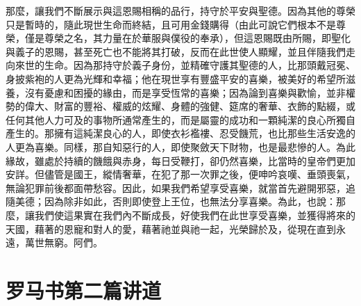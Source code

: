 那麼，讓我們不斷展示與這恩賜相稱的品行，持守於平安與聖德。因為其他的尊榮只是暫時的，隨此現世生命而終結，且可用金錢購得（由此可說它們根本不是尊榮，僅是尊榮之名，其力量在於華服與僕役的奉承），但這恩賜既由所賜，即聖化與義子的恩賜，甚至死亡也不能將其打破，反而在此世使人顯耀，並且伴隨我們走向來世的生命。因為那持守於義子身份，並精確守護其聖德的人，比那頭戴冠冕、身披紫袍的人更為光輝和幸福；他在現世享有豐盛平安的喜樂，被美好的希望所滋養，沒有憂慮和困擾的緣由，而是享受恆常的喜樂；因為論到喜樂與歡愉，並非權勢的偉大、財富的豐裕、權威的炫耀、身體的強健、筵席的奢華、衣飾的點綴，或任何其他人力可及的事物所通常產生的，而是屬靈的成功和一顆純潔的良心所獨自產生的。那擁有這純潔良心的人，即使衣衫襤褸、忍受饑荒，也比那些生活安逸的人更為喜樂。同樣，那自知惡行的人，即使聚斂天下財物，也是最悲慘的人。為此緣故，雖處於持續的饑餓與赤身，每日受鞭打，卻仍然喜樂，比當時的皇帝們更加安詳。但儘管是國王，縱情奢華，在犯了那一次罪之後，便呻吟哀嘆、垂頭喪氣，無論犯罪前後都面帶愁容。因此，如果我們希望享受喜樂，就當首先避開邪惡，追隨美德；因為除非如此，否則即使登上王位，也無法分享喜樂。為此，也說：那麼，讓我們使這果實在我們內不斷成長，好使我們在此世享受喜樂，並獲得將來的天國，藉著的恩寵和對人的愛，藉著祂並與祂一起，光榮歸於及，從現在直到永遠，萬世無窮。阿們。\par



\section{罗马书第二篇讲道}

\par

\par

